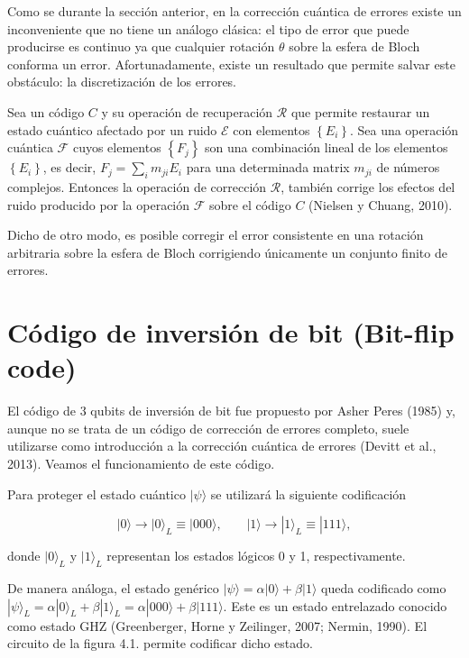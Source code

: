 Como se durante la sección anterior, en la corrección cuántica de errores existe un inconveniente que no tiene un análogo clásica: el tipo de error que puede producirse es continuo ya que cualquier rotación  $\theta$ sobre la esfera de Bloch conforma un error. Afortunadamente, existe un resultado que permite salvar este obstáculo: la discretización de los errores. 

\begin{theorem}

Sea un código $C$ y su operación de recuperación $\mathcal{R}$ que permite restaurar un estado cuántico afectado por un ruido $\mathscr{E}$ con elementos $ \left \{ E_i \right \} $. Sea una operación cuántica $\mathscr{F}$ cuyos elementos $ \left \{ F_j \right \} $ son una combinación lineal de los elementos $ \left \{ E_i \right \} $, es decir, $ F_j = \sum_i m_{ji} E_i $ para una determinada matrix $m_{ji}$ de números complejos. Entonces la operación de corrección $\mathcal{R}$, también corrige los efectos del ruido producido por la operación $\mathscr{F}$ sobre el código $C$ (Nielsen y Chuang, 2010).
\end{theorem}

Dicho de otro modo, es posible corregir el error consistente en una rotación arbitraria sobre la esfera de Bloch corrigiendo únicamente un conjunto finito de errores.




\section{Código de inversión de bit (Bit-flip code)}

El código de 3 qubits de inversión de bit fue propuesto por Asher Peres (1985) y, aunque no se trata de un código de corrección de errores completo, suele utilizarse como introducción a la corrección cuántica de errores (Devitt et al., 2013). Veamos el funcionamiento de este código.

Para proteger el estado cuántico $ | \psi \rangle $ se utilizará la siguiente codificación

$$ | 0 \rangle \rightarrow | 0 \rangle_L \equiv | 000 \rangle,  \phantom{abcd}   | 1 \rangle \rightarrow | 1 \rangle_L \equiv | 111 \rangle, $$

donde $ |0 \rangle_L$ y $| 1 \rangle_L $ representan los estados lógicos 0 y 1, respectivamente.

De manera análoga, el estado genérico $| \psi \rangle = \alpha |0 \rangle + \beta | 1 \rangle $ queda codificado como $|\psi \rangle_L = \alpha | 0 \rangle_L + \beta | 1 \rangle_L = \alpha | 000 \rangle + \beta | 111 \rangle $. Este es un estado entrelazado conocido como estado GHZ (Greenberger, Horne y Zeilinger, 2007; Nermin, 1990). El circuito de la figura 4.1. permite codificar dicho estado.

